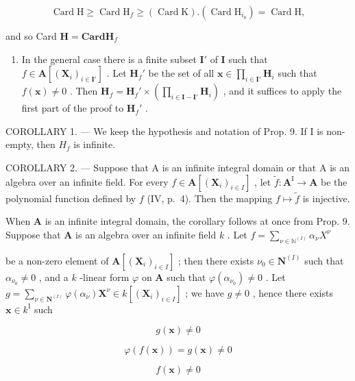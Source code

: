 \[
\operatorname{Card} \mathrm{H} \geqslant \operatorname{Card} \mathrm{H} _ {f} \geqslant (\operatorname{Card} \mathrm{K}). (\operatorname{Card} \mathrm{H} _ {i _ {0}}) = \operatorname{Card} \mathrm{H},
\]

and so Card \(\mathbf{H} = \mathbf{Card}\mathbf{H}_f\)

\begin{enumerate}
\def\labelenumi{\alph{enumi})}
\setcounter{enumi}{1}
\tightlist
\item
  In the general case there is a finite subset \(\mathbf{I}'\) of \(\mathbf{I}\) such that \(f \in \mathbf{A}[(\mathbf{X}_i)_{i \in \mathbf{I}'}]\) . Let \(\mathbf{H}_f'\) be the set of all \(\mathbf{x} \in \prod_{i \in \mathbf{I}'} \mathbf{H}_i\) such that \(f(\mathbf{x}) \neq 0\) . Then \(\mathbf{H}_f = \mathbf{H}_f' \times \left( \prod_{i \in \mathbf{I} - \mathbf{I}'} \mathbf{H}_i \right)\) , and it suffices to apply the first part of the proof to \(\mathbf{H}_f'\) .
\end{enumerate}

COROLLARY 1. --- We keep the hypothesis and notation of Prop. 9. If I is non-empty, then \(H_{f}\) is infinite.

COROLLARY 2. --- Suppose that A is an infinite integral domain or that A is an algebra over an infinite field. For every \(f \in \mathbf{A}[(\mathbf{X}_i)_{i \in I}]\) , let \(\tilde{f}: \mathbf{A}^{\mathrm{I}} \to \mathbf{A}\) be the polynomial function defined by \(f\) (IV, p.~4). Then the mapping \(f \mapsto \tilde{f}\) is injective.

When \(\mathbf{A}\) is an infinite integral domain, the corollary follows at once from Prop. 9. Suppose that \(\mathbf{A}\) is an algebra over an infinite field \(k\) . Let \(f = \sum_{\nu \in \mathbb{N}^{(I)}} \alpha_{\nu} X^{\nu}\)

be a non-zero element of \(\mathbf{A}[(\mathbf{X}_i)_{i\in I}]\) ; then there exists \(\nu_0\in \mathbf{N}^{(I)}\) such that \(\alpha_{\nu_0}\neq 0\) , and a \(k\) -linear form \(\varphi\) on \(\mathbf{A}\) such that \(\varphi (\alpha_{\nu_0})\neq 0\) . Let \(g = \sum_{\nu \in \mathbf{N}^{(I)}}\varphi (\alpha_{\nu})\mathbf{X}^{\nu}\in k[(\mathbf{X}_i)_{i\in I}]\) ; we have \(g\neq 0\) , hence there exists \(\mathbf{x}\in k^{\mathrm{I}}\) such

\[
g (\mathbf {x}) \neq 0
\]

\[
\varphi (f (\mathbf {x})) = g (\mathbf {x}) \neq 0
\]

\[
f (\mathbf {x}) \neq 0
\]

